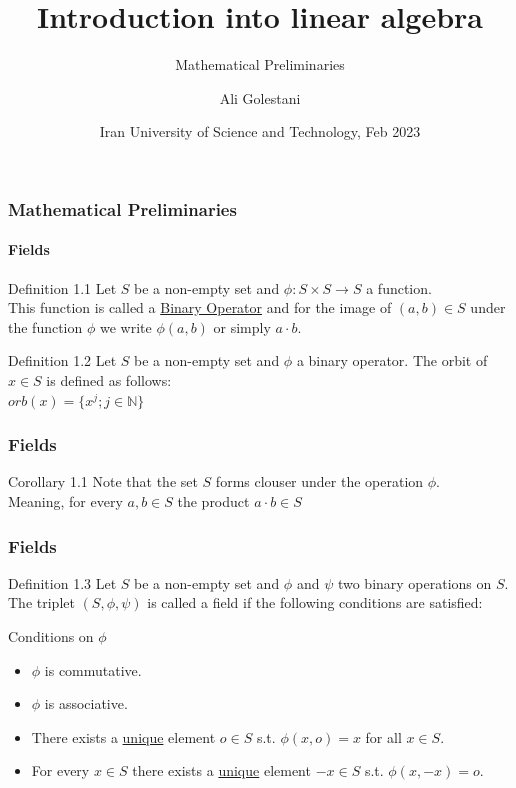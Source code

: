\documentclass{beamer}
\title[Linear Algebra 101] %
{Introduction into linear algebra}
\subtitle{Mathematical Preliminaries}
\author[Golestani, Ali]{Ali Golestani}
\institute[IUST] %
{
  \inst{}%
  Department of Mathematics\\
  Iran University of Science and Technology
}
\date[IUST 2023] %
{Iran University of Science and Technology, Feb 2023}
\begin{document}
\frame{\titlepage}

\begin{frame}
    \frametitle{Mathematical Preliminaries}
\framesubtitle{Fields}

\begin{block}{Definition 1.1}
    Let $S$ be a non-empty set and $\phi : S \times S \rightarrow S$ a function.\\
    This function is called a \underline{Binary Operator} and for the image of $(a,b) \in S$ under the function $\phi$ we write $\phi (a,b)$
    or simply $a \cdot b$.
\end{block}

\begin{block}{Definition 1.2}
    Let $S$ be a non-empty set and $\phi$ a binary operator. The orbit of $x \in S$ is defined as follows:\\
    $orb(x) = \{x^j; j \in \mathbb{N}\}$ 
\end{block}

\end{frame}

\begin{frame}
    \frametitle{Fields}

    \begin{alertblock}{Corollary 1.1}
        Note that the set $S$ forms clouser under the operation $\phi$.\\
        Meaning, for every $a,b \in S$ the product $a \cdot b \in S$
    \end{alertblock}
\end{frame}



\begin{frame}
    \frametitle{Fields}

\begin{block}{Definition 1.3}
    Let $S$ be a non-empty set and $\phi$ and $\psi$ two binary operations on $S$. The triplet $(S, \phi, \psi)$ is called a field if the following
    conditions are satisfied:
\end{block}

\begin{block}{Conditions on $\phi$}
    \begin{itemize}
        \item <3-> $\phi$ is commutative.
        \item <4-> $\phi$ is associative.
        \item <5-> There exists a \underline{unique} element $o \in S$ s.t. $\phi(x,o) = x$ for all $x \in S$.
        \item <6-> For every $x \in S$ there exists a \underline{unique} element $-x \in S$ s.t. $\phi(x,-x) = o$.
    \end{itemize}
\end{block}
\end{frame}
\end{document}
